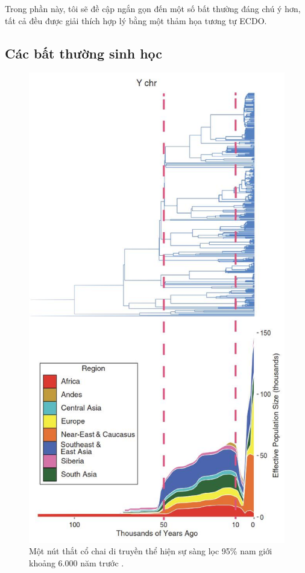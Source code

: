 \documentclass[10pt,twocolumn,letterpaper]{article}
\begin{document}
Trong phần này, tôi sẽ đề cập ngắn gọn đến một số bất thường đáng chú ý hơn, tất cả đều được giải thích hợp lý bằng một thảm họa tương tự ECDO.

\subsection{Các bất thường sinh học}

\begin{figure}[b]
\begin{center}
   \includegraphics[width=1\linewidth]{bottleneck.jpg}
\end{center}
   \caption{Một nút thắt cổ chai di truyền thể hiện sự sàng lọc 95\% nam giới khoảng 6.000 năm trước \cite{62}.}
\label{fig:10}
\label{fig:onecol}
\end{figure}
\end{document}
